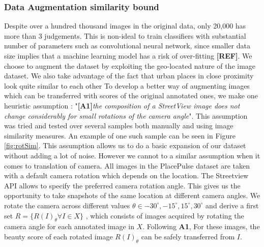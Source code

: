 \subsubsection{Data Augmentation similarity bound}
\label{sec:bound}
Despite over a hundred thousand images in the original data, only 20,000 has more than 3 judgements.
This is non-ideal to train classifiers with substantial number of parameters such as convolutional neural network,
since smaller data size implies that a machine learning model has a risk of over-fitting \textbf{[REF]}. We choose to augment the dataset by exploiting the geo-located nature of the image dataset. We also take advantage of the fact that urban places in close proximity look quite similar to each other \cite{parislooklikeparis}  
To develop a better way of augmenting images which can be transferred with scores of the original annotated ones, we make one heuristic assumption : "\textbf{[A1]}\textit{the composition of a StreetView image does not change considerably for small rotations of the camera angle}". This assumption was tried and tested over several samples both manually and using image similarity measures. An example of one such sample can be seen in Figure \ref{fig:rotSim}. This assumption allows us to do a basic expansion of our dataset without adding a lot of noise. However we cannot to a similar assumption when it comes to translation of camera. 
All images in the PlacePulse dataset are taken with a default camera rotation which depends on the location. The Streetview API allows to specify the preferred camera rotation angle. This gives us the opportunity to take snapshots of the same location at different camera angles. We rotate the camera across different values $\theta \in {-30^{\circ}, -15^{\circ} , 15^{\circ} , 30^{\circ} }$ and derive a first set  $R=\{R(I)_{\theta} \forall I \in X\}$ , which consists of images acquired by rotating the camera angle for each annotated image in $X$. Following \textbf{A1}, For these images, the beauty score of each rotated image $R(I)_{\theta}$ can be safely transferred from $I$. 

